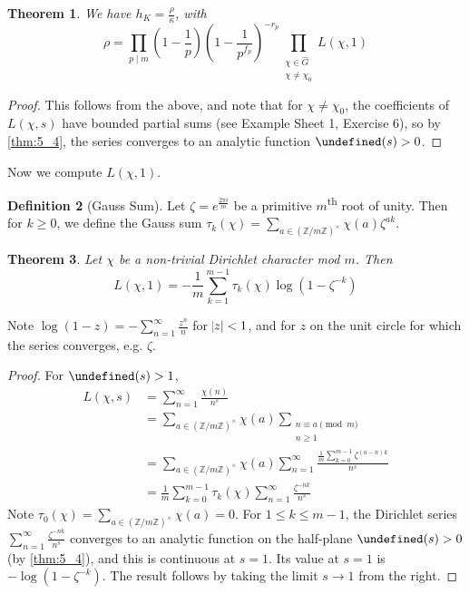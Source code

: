 \documentclass[11pt]{article}
\theoremstyle{definition}
\newtheorem{definition}{Definition}[section]
\theoremstyle{plain}
\newtheorem{theorem}[definition]{Theorem}
\theoremstyle{remark}
\let\Re\undefined
\DeclareMathOperator{\Re}{Re}
\newcommand{\ZZ}{\mathbb{Z}}
\begin{document}
\begin{theorem}\label{thm:7_20}
    We have $h_K = \frac{\rho}{\kappa}$, with
    \begin{equation*}
        \rho = \prod_{p \mid m} \left(1 - \frac{1}{p}\right)\left(1 - \frac{1}{p^{f_p}}\right)^{-r_p} \prod_{\substack{\chi \in \widehat{G}\\\chi \neq \chi_0}} L(\chi, 1)
    \end{equation*}
\end{theorem}
\begin{proof}
    This follows from the above, and note that for $\chi \neq \chi_0$, the coefficients of $L(\chi, s)$ have bounded partial sums (see Example Sheet 1, Exercise 6), so by \autoref{thm:5_4}, the series converges to an analytic function $\Re(s) > 0$.
\end{proof}

Now we compute $L(\chi, 1)$.

\begin{definition}[Gauss Sum]\label{def:7_21}
    Let $\zeta = e^{\frac{2 \pi i}{m}}$ be a primitive $m$\textsuperscript{th} root of unity. Then for $k \ge 0$, we define the Gauss sum $\tau_k(\chi) = \sum_{a \in (\ZZ / m\ZZ)^\times} \chi(a) \zeta^{ak}$.
\end{definition}

\begin{theorem}\label{thm:7_22}
    Let $\chi$ be a non-trivial Dirichlet character mod $m$. Then
    \begin{equation*}
        L(\chi, 1) = -\frac{1}{m} \sum_{k=1}^{m-1} \tau_k(\chi) \log(1 - \zeta^{-k})
    \end{equation*}
\end{theorem}

\noindent Note $\log(1-z) = -\sum_{n=1}^\infty \frac{z^n}{n}$ for $\abs{z} < 1$, and for $z$ on the unit circle for which the series converges, e.g. $\zeta$.

\begin{proof}
    For $\Re(s) > 1$,
    \begin{align*}
        L(\chi, s)
        &= \sum_{n=1}^\infty \frac{\chi(n)}{n^s}\\
        &= \sum_{a \in (\ZZ / m\ZZ)^\times} \chi(a) \sum_{\substack{n \equiv a \pmod{m}\\n \ge 1}}\\
        &= \sum_{a \in (\ZZ / m\ZZ)^\times} \chi(a) \sum_{n=1}^\infty \frac{\frac{1}{m} \sum_{k=0}^{m-1} \zeta^{(a-n)k}}{n^s}\\
        &= \frac{1}{m} \sum_{k=0}^{m-1} \tau_k(\chi) \sum_{n=1}^\infty \frac{\zeta^{-nk}}{n^s}
    \end{align*}
    Note $\tau_0(\chi) = \sum_{a \in (\ZZ/m\ZZ)^\times} \chi(a) = 0$. For $1 \le k \le m-1$, the Dirichlet series $\sum_{n=1}^\infty \frac{\zeta^{-nk}}{n^s}$ converges to an analytic function on the half-plane $\Re(s) > 0$ (by \autoref{thm:5_4}), and this is continuous at $s=1$. Its value at $s=1$ is $-\log(1-\zeta^{-k})$. The result follows by taking the limit $s \to 1$ from the right.
\end{proof}
\end{document}
